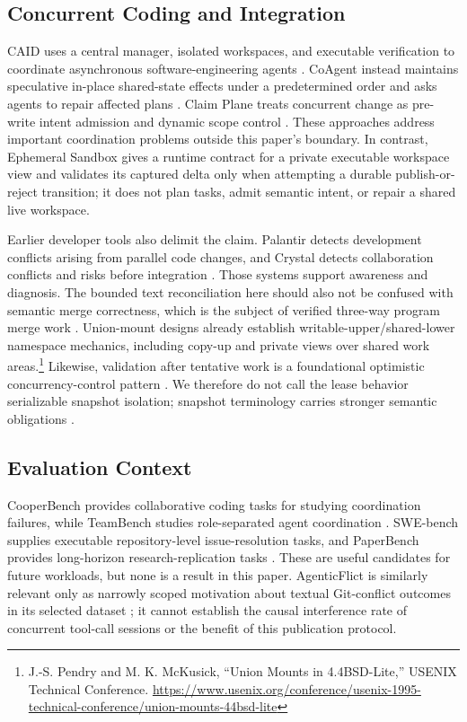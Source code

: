 \subsection{Concurrent Coding and Integration}

CAID uses a central manager, isolated workspaces, and executable verification
to coordinate asynchronous software-engineering agents
\cite{caid_2026}. CoAgent instead maintains speculative in-place shared-state
effects under a predetermined order and asks agents to repair affected plans
\cite{coagent_2026}. Claim Plane treats concurrent change as pre-write intent
admission and dynamic scope control \cite{claimplane_2026}. These approaches
address important coordination problems outside this paper's boundary. In
contrast, Ephemeral Sandbox gives a runtime contract for a private executable
workspace view and validates its captured delta only when attempting a durable
publish-or-reject transition; it does not plan tasks, admit semantic intent,
or repair a shared live workspace.

Earlier developer tools also delimit the claim. Palantir detects development
conflicts arising from parallel code changes, and Crystal detects collaboration
conflicts and risks before integration \cite{palantir_2012,crystal_2013}.
Those systems support awareness and diagnosis. The bounded text reconciliation
here should also not be confused with semantic merge correctness, which is the
subject of verified three-way program merge work \cite{threewaymerge_2018}.
Union-mount designs already establish writable-upper/shared-lower namespace
mechanics, including copy-up and private views over shared work areas.\footnote{J.-S.
Pendry and M. K. McKusick, ``Union Mounts in 4.4BSD-Lite,'' USENIX Technical
Conference. \url{https://www.usenix.org/conference/usenix-1995-technical-conference/union-mounts-44bsd-lite}}
Likewise, validation after tentative work is a foundational optimistic
concurrency-control pattern \cite{occ_1981}. We therefore do not call the
lease behavior serializable snapshot isolation; snapshot terminology carries
stronger semantic obligations \cite{snapshot_isolation_1995}.

\subsection{Evaluation Context}

CooperBench provides collaborative coding tasks for studying coordination
failures, while TeamBench studies role-separated agent coordination
\cite{cooperbench_2026,teambench_2026}. SWE-bench supplies executable
repository-level issue-resolution tasks, and PaperBench provides long-horizon
research-replication tasks \cite{swebench_2024,paperbench_2025}. These are
useful candidates for future workloads, but none is a result in this paper.
AgenticFlict is similarly relevant only as narrowly scoped motivation about
textual Git-conflict outcomes in its selected dataset
\cite{agenticflict_2026}; it cannot establish the causal interference rate of
concurrent tool-call sessions or the benefit of this publication protocol.
